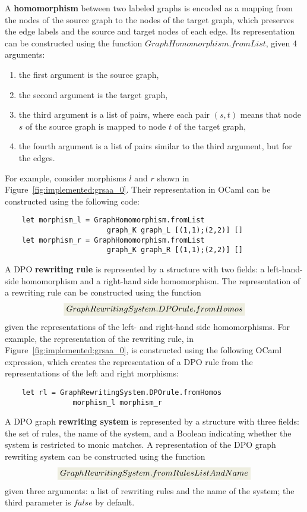 A \textbf{homomorphism} between two labeled graphs is encoded as a mapping from the nodes of the source graph to the nodes of the target graph, which preserves the edge labels and the source and target nodes of each edge. Its representation can be constructed using the function
\colorbox{Ivory2}{$GraphHomomorphism.fromList$}, given 4 arguments:
    \begin{enumerate}
        \item the first argument is the source graph,
        \item the second argument is the target graph,
        \item the third argument is a list of pairs, where each pair $(s,t)$ means that node $s$ of the source graph is mapped to node $t$ of the target graph,
        \item the fourth argument is a list of pairs similar to the third argument, but for the edges.
    \end{enumerate}
For example, consider morphisms $l$ and $r$ shown in Figure~\ref{fig:implemented:grsaa_0}. Their representation in OCaml can be constructed using the following code:
\begin{verbatim}
    let morphism_l = GraphHomomorphism.fromList 
                        graph_K graph_L [(1,1);(2,2)] []
    let morphism_r = GraphHomomorphism.fromList
                        graph_K graph_R [(1,1);(2,2)] []
\end{verbatim}

A DPO \textbf{rewriting rule} is represented by a structure with two fields: a left-hand-side homomorphism and a right-hand side homomorphism. The representation of a rewriting rule can be constructed using the function
 $$\colorbox{Ivory2}{$GraphRewritingSystem.DPOrule.fromHomos$}$$
given the representations of the left- and right-hand side homomorphisms.
For example, the representation of the rewriting rule, in Figure~\ref{fig:implemented:grsaa_0}, is constructed using the following OCaml expression, which creates the representation of a DPO rule from the representations of the left and right morphisms: 
\begin{verbatim}
    let rl = GraphRewritingSystem.DPOrule.fromHomos 
                morphism_l morphism_r
\end{verbatim}

A DPO graph \textbf{rewriting system} is represented by a structure with three fields: the set of rules, the name of the system, and a Boolean indicating whether the system is restricted to monic matches. A representation of the DPO graph rewriting system
can be constructed using the function 
$$\colorbox{Ivory2}{$GraphRewritingSystem.fromRulesListAndName$}$$ given three arguments: a list of rewriting rules and the name of the system; the third parameter is \colorbox{Ivory2}{$false$} by default.

